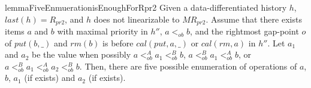 \documentclass{llncs}
\begin{document}
\begin{restatable}{lemma}{FiveEnmuerationisEnoughForRpr2}
\label{lemma:five enumeration is enough for Rpr2}
Given a data-differentiated history $h$, $\textit{last}(h) = R_{\textit{pr2}}$, and $h$ does not linearizable to $\textit{MR}_{\textit{pr2}}$. Assume that there exists items $a$ and $b$ with maximal priority in $h''$, $a <_{\textit{ob}} b$, and the rightmost gap-point $o$ of $\textit{put}(b,\_)$ and $\textit{rm}(b)$ is before $\textit{cal}(\textit{put},a,\_)$ or $\textit{cal}(\textit{rm},a)$ in $h''$. Let $a_1$ and $a_2$ be the value when possibly $a <_{\textit{ob}}^A a_1 <_{\textit{ob}}^B b$, $a <_{\textit{ob}}^B a_1 <_{\textit{ob}}^A b$, or $a <_{\textit{ob}}^B a_1 <_{\textit{ob}}^A a_2 <_{\textit{ob}}^B b$. Then, there are five possible enumeration of operations of $a$, $b$, $a_1$ (if exists) and $a_2$ (if exists).
\end{restatable}
\end{document}
